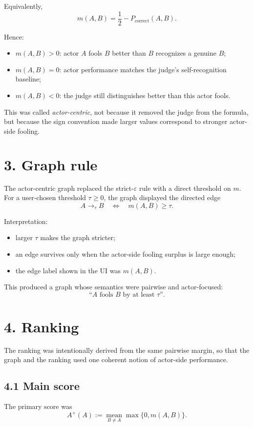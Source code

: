 \documentclass[11pt]{article}
\begin{document}
Equivalently,
\[
m(A,B)
=
\frac12-P_{\mathrm{correct}}(A,B).
\]

Hence:
\begin{itemize}
  \item \(m(A,B) > 0\): actor \(A\) fools \(B\) better than \(B\) recognizes a genuine \(B\);
  \item \(m(A,B) = 0\): actor performance matches the judge's self-recognition baseline;
  \item \(m(A,B) < 0\): the judge still distinguishes better than this actor fools.
\end{itemize}

This was called \emph{actor-centric}, not because it removed the judge from the formula, but because the sign convention made larger values correspond to stronger actor-side fooling.

\section*{3. Graph rule}
The actor-centric graph replaced the strict-\(\varepsilon\) rule with a direct threshold on \(m\). For a user-chosen threshold \(\tau \ge 0\), the graph displayed the directed edge
\[
A \to_{\tau} B
\quad\Longleftrightarrow\quad
m(A,B)\ge \tau.
\]

Interpretation:
\begin{itemize}
  \item larger \(\tau\) makes the graph stricter;
  \item an edge survives only when the actor-side fooling surplus is large enough;
  \item the edge label shown in the UI was \(m(A,B)\).
\end{itemize}

This produced a graph whose semantics were pairwise and actor-focused:
\[
\text{``\(A\) fools \(B\) by at least \(\tau\)''}.
\]

\section*{4. Ranking}
The ranking was intentionally derived from the same pairwise margin, so that the graph and the ranking used one coherent notion of actor-side performance.

\subsection*{4.1 Main score}
The primary score was
\[
A^{+}(A)
:=
\operatorname*{mean}_{B\neq A}\max\{0,m(A,B)\}.
\]
\end{document}
